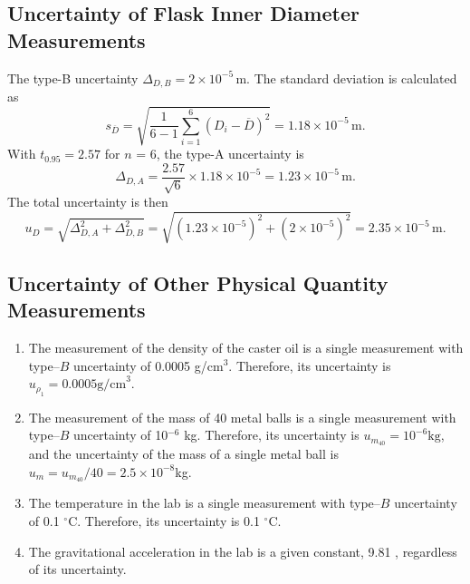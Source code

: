 \documentclass[a4paper]{article}
\begin{document}
	\subsection{Uncertainty of Flask Inner Diameter Measurements}
The type-B uncertainty $\Delta_{D,B} = 2\times10^{-5} \,\text{m}$. The standard deviation is calculated as
$$s_{\overline{D}} =\sqrt{\frac{1}{6-1}\sum \limits_{i=1}^{6}(D_i-\overline{D})^2} = 1.18\times 10^{-5}\,\text{m}.$$
With $t_{0.95} = 2.57$ for $n$ = 6, the type-A uncertainty is
$$\Delta_{D,A} = \frac{2.57}{\sqrt{6}}\times1.18\times10^{-5} = 1.23\times10^{-5} \,\text{m}.$$
The total uncertainty is then
$$u_D = \sqrt{\Delta_{D,A}^2+\Delta_{D,B}^2} = \sqrt{(1.23\times10^{-5})^2+(2\times10^{-5})^2} =   2.35\times10^{-5} \,\text{m}.$$

	\subsection{Uncertainty of Other Physical Quantity Measurements}
\begin{enumerate}
\item The measurement of the density of the caster oil is a single measurement with type--$B$ uncertainty of 0.0005 g/cm$^3$. Therefore, its uncertainty is $u_{\rho_1} = 0.0005 \text{g/cm}^3.$
\item The measurement of the mass of 40 metal balls is a single measurement with type--$B$ uncertainty of 10$^{-6}$ kg. Therefore, its uncertainty is $u_{m_{40}} = 10^{-6} \text{kg}$, and the uncertainty of the mass of a single metal ball is $u_m = u_{m_{40}}/40 = 2.5\times10^{-8}$kg.
\item The temperature in the lab is a single measurement with type--$B$ uncertainty of 0.1 $^{\circ}$C. Therefore, its uncertainty is 0.1 $^{\circ}$C.
\item The gravitational acceleration in the lab is a given constant, 9.81 , regardless of its uncertainty.
\end{enumerate}
\end{document}
